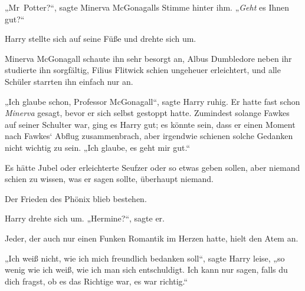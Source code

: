 „Mr~Potter?“, sagte Minerva McGonagalls Stimme hinter ihm. „\emph{Geht} es Ihnen gut?“

Harry stellte sich auf seine Füße und drehte sich um.

Minerva McGonagall schaute ihn sehr besorgt an, Albus Dumbledore neben ihr studierte ihn sorgfältig, Filius Flitwick schien ungeheuer erleichtert, und alle Schüler starrten ihn einfach nur an.

„Ich glaube schon, Professor McGonagall“, sagte Harry ruhig. Er hatte fast schon \emph{Minerva} gesagt, bevor er sich selbst gestoppt hatte. Zumindest solange Fawkes auf seiner Schulter war, ging es Harry gut; es könnte sein, dass er einen Moment nach Fawkes‘ Abflug zusammenbrach, aber irgendwie schienen solche Gedanken nicht wichtig zu sein. „Ich glaube, es geht mir gut.“

Es hätte Jubel oder erleichterte Seufzer oder so etwas geben sollen, aber niemand schien zu wissen, was er sagen sollte, überhaupt niemand.

Der Frieden des Phönix blieb bestehen.

Harry drehte sich um. „Hermine?“, sagte er.

Jeder, der auch nur einen Funken Romantik im Herzen hatte, hielt den Atem an.

„Ich weiß nicht, wie ich mich freundlich bedanken soll“, sagte Harry leise, „so wenig wie ich weiß, wie ich man sich entschuldigt. Ich kann nur sagen, falls du dich fragst, ob es das Richtige war, es war richtig.“

